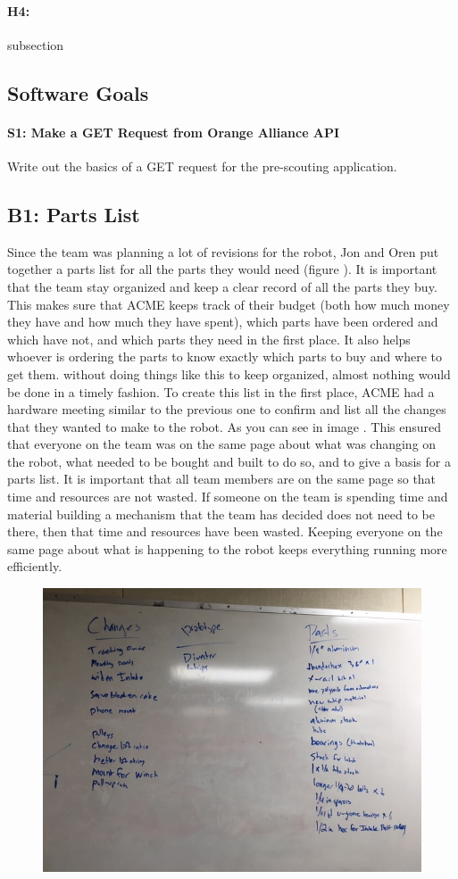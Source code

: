 \documentclass{article}
\begin{document}
\paragraph{H4: }
subsection{
\subsection{Software Goals}
\paragraph{S1: Make a GET Request from Orange Alliance API}
 Write out the basics of a GET request for the pre-scouting application.
\newpage
\subsection{B1: Parts List}

Since the team was planning a lot of revisions for the robot, Jon and Oren put together a parts list for all the parts they would need (figure ). It is important that the team stay organized and keep a clear record of all the parts they buy. This makes sure that ACME keeps track of their budget (both how much money they have and how much they have spent), which parts have been ordered and which have not, and which parts they need in the first place. It also helps whoever is ordering the parts to know exactly which parts to buy and where to get them. without doing things like this to keep organized, almost nothing would be done in a timely fashion. To create this list in the first place, ACME had a hardware meeting similar to the previous one to confirm and list all the changes that they wanted to make to the robot. As you can see in image . This ensured that everyone on the team was on the same page about what was changing on the robot, what needed to be bought and built to do so, and to give a basis for a parts list. It is important that all team members are on the same page so that time and resources are not wasted. If someone on the team is spending time and material building a mechanism that the team has decided does not need to be there, then that time and resources have been wasted. Keeping everyone on the same page about what is happening to the robot keeps everything running more efficiently.

\begin{figure}
    \centering
    \includegraphics[width=.6 \textwidth]{14_12-03/images/IMG_0422.JPG}
    \caption{}
    \label{fig: Parts list}
\end{figure}
}
\end{document}
